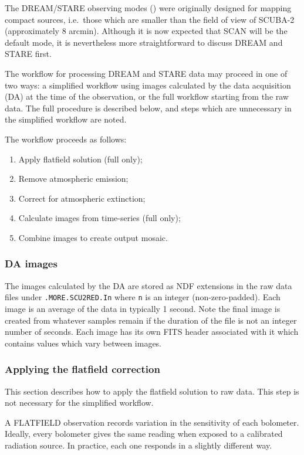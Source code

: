\documentclass[twoside,11pt]{article}
\newcommand{\xlabel}[1]{}
\renewcommand{\_}{\texttt{\symbol{95}}}
\begin{document}
The DREAM/STARE observing modes (\cite{scuba2}) were originally
designed for mapping compact sources, i.e.\ those which are smaller
than the field of view of SCUBA-2 (approximately 8 arcmin). Although
it is now expected that SCAN will be the default mode, it is
nevertheless more straightforward to discuss DREAM and STARE first.

The workflow for processing DREAM and STARE data may proceed in one of
two ways: a simplified workflow using images calculated by the data
acquisition (DA) at the time of the observation, or the full workflow
starting from the raw data. The full procedure is described below, and
steps which are unnecessary in the simplified workflow are noted.

The workflow proceeds as follows:
\begin{enumerate}
\item Apply flatfield solution (full only);
\item Remove atmospheric emission;
\item Correct for atmospheric extinction;
\item Calculate images from time-series (full only);
\item Combine images to create output mosaic.
\end{enumerate}

\subsubsection{DA images}

The images calculated by the DA are stored as NDF extensions in the
raw data files under \texttt{.MORE.SCU2RED.In} where \texttt{n} is an
integer (non-zero-padded). Each image is an average of the data in
typically 1 second. Note the final image is created from whatever
samples remain if the duration of the file is not an integer number of
seconds. Each image has its own FITS header associated with it which
contains values which vary between images.

\subsubsection{\xlabel{flatfield}Applying the flatfield correction\label{se:flatfield}}

This section describes how to apply the flatfield solution to raw
data. This step is not necessary for the simplified workflow.

A FLATFIELD observation records variation in the sensitivity of each
bolometer. Ideally, every bolometer gives the same reading when
exposed to a calibrated radiation source. In practice, each one
responds in a slightly different way.
\end{document}
